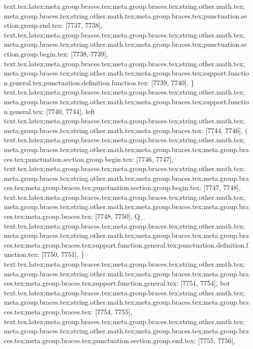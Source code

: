 {{{{{{{{{{{{{{{{{{{{{{{{{{{{{{{{{{{{{{{{{{{{{{{{{{{{{{{{{{{{{{{{{{{{{{{{{{{{{{{{{{{{{{{{{{{{{{{{{{{{{{{{{{{{{{{{{{{{{{{{{{{{{{{{{{{{{{{{{{{{{{{{{{{{{{{{{{{{{{{{{{{{{{{{{{{{{{{{{{{{{{{{{{{{{{{{{{{{{{{{{{{{{{{{{{{{{{{{{{{{{{{{text.tex.latex;meta.group.braces.tex;meta.group.braces.tex;string.other.math.tex;meta.group.braces.tex;string.other.math.tex;meta.group.braces.tex;punctuation.section.group.end.tex: [7737, 7738], {}}
text.tex.latex;meta.group.braces.tex;meta.group.braces.tex;string.other.math.tex;meta.group.braces.tex;string.other.math.tex;meta.group.braces.tex;punctuation.section.group.begin.tex: [7738, 7739], {{}
text.tex.latex;meta.group.braces.tex;meta.group.braces.tex;string.other.math.tex;meta.group.braces.tex;string.other.math.tex;meta.group.braces.tex;support.function.general.tex;punctuation.definition.function.tex: [7739, 7740], {\}
text.tex.latex;meta.group.braces.tex;meta.group.braces.tex;string.other.math.tex;meta.group.braces.tex;string.other.math.tex;meta.group.braces.tex;support.function.general.tex: [7740, 7744], {left}
text.tex.latex;meta.group.braces.tex;meta.group.braces.tex;string.other.math.tex;meta.group.braces.tex;string.other.math.tex;meta.group.braces.tex: [7744, 7746], {( }
text.tex.latex;meta.group.braces.tex;meta.group.braces.tex;string.other.math.tex;meta.group.braces.tex;string.other.math.tex;meta.group.braces.tex;meta.group.braces.tex;punctuation.section.group.begin.tex: [7746, 7747], {{}
text.tex.latex;meta.group.braces.tex;meta.group.braces.tex;string.other.math.tex;meta.group.braces.tex;string.other.math.tex;meta.group.braces.tex;meta.group.braces.tex;meta.group.braces.tex;punctuation.section.group.begin.tex: [7747, 7748], {{}
text.tex.latex;meta.group.braces.tex;meta.group.braces.tex;string.other.math.tex;meta.group.braces.tex;string.other.math.tex;meta.group.braces.tex;meta.group.braces.tex;meta.group.braces.tex: [7748, 7750], {Q_}
text.tex.latex;meta.group.braces.tex;meta.group.braces.tex;string.other.math.tex;meta.group.braces.tex;string.other.math.tex;meta.group.braces.tex;meta.group.braces.tex;meta.group.braces.tex;support.function.general.tex;punctuation.definition.function.tex: [7750, 7751], {\}
text.tex.latex;meta.group.braces.tex;meta.group.braces.tex;string.other.math.tex;meta.group.braces.tex;string.other.math.tex;meta.group.braces.tex;meta.group.braces.tex;meta.group.braces.tex;support.function.general.tex: [7751, 7754], {bot}
text.tex.latex;meta.group.braces.tex;meta.group.braces.tex;string.other.math.tex;meta.group.braces.tex;string.other.math.tex;meta.group.braces.tex;meta.group.braces.tex;meta.group.braces.tex: [7754, 7755], { }
text.tex.latex;meta.group.braces.tex;meta.group.braces.tex;string.other.math.tex;meta.group.braces.tex;string.other.math.tex;meta.group.braces.tex;meta.group.braces.tex;meta.group.braces.tex;punctuation.section.group.end.tex: [7755, 7756], {}}
}}}}}}}}}}}}}}}}}}}}}}}}}}}}}}}}}}}}}}}}}}}}}}}}}}}}}}}}}}}}}}}}}}}}}}}}}}}}}}}}}}}}}}}}}}}}}}}}}}}}}}}}}}}}}}}}}}}}}}}}}}}}}}}}}}}}}}}}}}}}}}}}}}}}}}}}}}}}}}}}}}}}}}}}}}}}}}}}}}}}}}}}}}}}}}}}}}}}}}}}}}}}}}}}}}}}}}}}}}}}}}}}}}}
